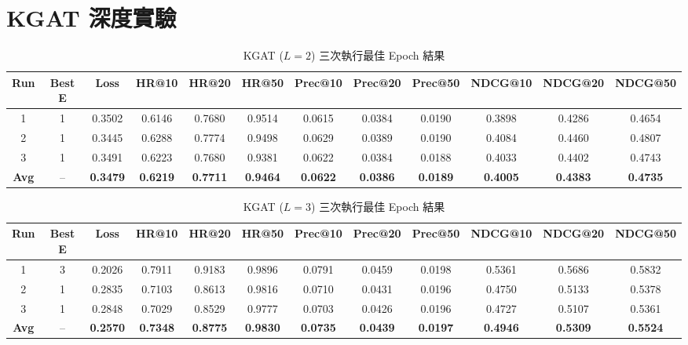 \section{KGAT 深度實驗}

\begin{table}[H]
  \centering
  \footnotesize
  \setlength{\tabcolsep}{3pt}
  \caption{KGAT ($L{=}2$) 三次執行最佳 Epoch 結果}
  \label{tab:kgat_l2_runs}
  \begin{tabular}{c c c ccc ccc ccc}
    \toprule
    Run & Best E & Loss & HR@10 & HR@20 & HR@50 & Prec@10 & Prec@20 & Prec@50 & NDCG@10 & NDCG@20 & NDCG@50 \\
    \midrule
    1 & 1 & 0.3502 & 0.6146 & 0.7680 & 0.9514 & 0.0615 & 0.0384 & 0.0190 & 0.3898 & 0.4286 & 0.4654 \\
    2 & 1 & 0.3445 & 0.6288 & 0.7774 & 0.9498 & 0.0629 & 0.0389 & 0.0190 & 0.4084 & 0.4460 & 0.4807 \\
    3 & 1 & 0.3491 & 0.6223 & 0.7680 & 0.9381 & 0.0622 & 0.0384 & 0.0188 & 0.4033 & 0.4402 & 0.4743 \\
    \midrule
    \textbf{Avg} & -- & \textbf{0.3479} & \textbf{0.6219} & \textbf{0.7711} & \textbf{0.9464} & \textbf{0.0622} & \textbf{0.0386} & \textbf{0.0189} & \textbf{0.4005} & \textbf{0.4383} & \textbf{0.4735} \\
    \bottomrule
  \end{tabular}
\end{table}

\begin{table}[H]
  \centering
  \footnotesize
  \setlength{\tabcolsep}{3pt}
  \caption{KGAT ($L{=}3$) 三次執行最佳 Epoch 結果}
  \label{tab:kgat_l3_runs}
  \begin{tabular}{c c c ccc ccc ccc}
    \toprule
    Run & Best E & Loss & HR@10 & HR@20 & HR@50 & Prec@10 & Prec@20 & Prec@50 & NDCG@10 & NDCG@20 & NDCG@50 \\
    \midrule
    1 & 3 & 0.2026 & 0.7911 & 0.9183 & 0.9896 & 0.0791 & 0.0459 & 0.0198 & 0.5361 & 0.5686 & 0.5832 \\
    2 & 1 & 0.2835 & 0.7103 & 0.8613 & 0.9816 & 0.0710 & 0.0431 & 0.0196 & 0.4750 & 0.5133 & 0.5378 \\
    3 & 1 & 0.2848 & 0.7029 & 0.8529 & 0.9777 & 0.0703 & 0.0426 & 0.0196 & 0.4727 & 0.5107 & 0.5361 \\
    \midrule
    \textbf{Avg} & -- & \textbf{0.2570} & \textbf{0.7348} & \textbf{0.8775} & \textbf{0.9830} & \textbf{0.0735} & \textbf{0.0439} & \textbf{0.0197} & \textbf{0.4946} & \textbf{0.5309} & \textbf{0.5524} \\
    \bottomrule
  \end{tabular}
\end{table}
